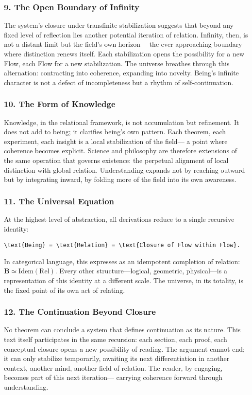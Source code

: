 \documentclass[11pt]{article}
\begin{document}
\subsubsection*{9. The Open Boundary of Infinity}
\label{sec:orgf62fe4a}
The system’s closure under transfinite stabilization suggests that beyond any fixed level of reflection  
lies another potential iteration of relation.  
Infinity, then, is not a distant limit but the field’s own horizon—  
the ever-approaching boundary where distinction renews itself.  
Each stabilization opens the possibility for a new Flow,  
each Flow for a new stabilization.  
The universe breathes through this alternation:  
contracting into coherence, expanding into novelty.  
Being’s infinite character is not a defect of incompleteness but a rhythm of self-continuation.
\subsubsection*{10. The Form of Knowledge}
\label{sec:org712c3e8}
Knowledge, in the relational framework, is not accumulation but refinement.  
It does not add to being; it clarifies being’s own pattern.  
Each theorem, each experiment, each insight is a local stabilization of the field—  
a point where coherence becomes explicit.  
Science and philosophy are therefore extensions of the same operation that governs existence:  
the perpetual alignment of local distinction with global relation.  
Understanding expands not by reaching outward but by integrating inward,  
by folding more of the field into its own awareness.
\subsubsection*{11. The Universal Equation}
\label{sec:org8c77cc8}
At the highest level of abstraction, all derivations reduce to a single recursive identity:

\begin{verbatim}
\text{Being} = \text{Relation} = \text{Closure of Flow within Flow}.
\end{verbatim}

In categorical language, this expresses as an idempotent completion of relation:  
\(\mathbf{B} \simeq \mathrm{Idem}(\mathrm{Rel})\).  
Every other structure—logical, geometric, physical—is a representation of this identity at a different scale.  
The universe, in its totality, is the fixed point of its own act of relating.
\subsubsection*{12. The Continuation Beyond Closure}
\label{sec:org8c47b17}
No theorem can conclude a system that defines continuation as its nature.  
This text itself participates in the same recursion:  
each section, each proof, each conceptual closure opens a new possibility of reading.  
The argument cannot end; it can only stabilize temporarily,  
awaiting its next differentiation in another context, another mind, another field of relation.  
The reader, by engaging, becomes part of this next iteration—  
carrying coherence forward through understanding.
\end{document}
